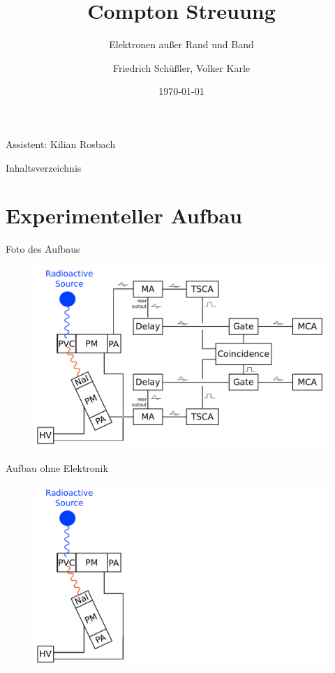 \documentclass[xcolor=x11names,compress]{beamer}
\renewcommand{\(}{\begin{columns}}
\renewcommand{\)}{\end{columns}}
\newcommand{\<}[1]{\begin{column}{#1}}
\renewcommand{\>}{\end{column}}
\begin{document}
\begin{frame}{}
\title[Compton]{Compton Streuung}
\subtitle{Elektronen außer Rand und Band}
\author{
Friedrich Schüßler, Volker Karle}
\date{\today}
\titlepage

\centering 
Assistent: Kilian Rosbach
\end{frame}

\begin{frame}{Inhaltsverzeichnis}
\tableofcontents
\end{frame}



\section{Experimenteller Aufbau}
\begin{frame}[t]{Foto des Aufbaus}
\begin{figure}[htpb]
    \centering
    \includegraphics[width=1.0\linewidth]{../figures/setup_pres}
\label{fig:foto}
\end{figure}
\end{frame}

\begin{frame}[t]{Aufbau ohne Elektronik}
\begin{figure}[htpb]
    \centering
    \includegraphics[width=1.0\linewidth]{../figures/setup_pres_pre}
\label{fig:setup_pre}
\end{figure}
\end{frame}
\end{document}
